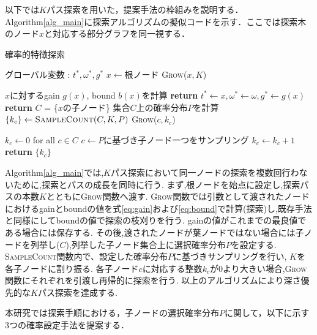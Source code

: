 以下では$K$パス探索を用いた，提案手法の枠組みを説明する．
Algorithm\ref{alg_main}に探索アルゴリズムの擬似コードを示す．ここでは探索木のノード$x$と対応する部分グラフを同一視する．
\begin{algorithm}
	\small 
	\caption{確率的特徴探索}\label{alg_main}
	\begin{algorithmic}[1]
		\State グローバル変数 : $t^*,\omega^*,g^*$
		\State $x \gets \text{根ノード}$ 
		\State \textsc{Grow}($x,K$)
		\EndProcedure

		\State $x$に対するgain $g(x)$, bound $b(x)$を計算
		\State \textbf{return}
		\EndIf
		\State $t^* \gets x,\omega^* \gets \omega,g^* \gets g(x)$
		\EndIf
		\State \textbf{return}
		\EndIf
		\State$C$ = \{$x$の子ノード\}
		\State 集合$C$上の確率分布$P$を計算 
		\State $\{k_c\} \gets \textsc{SampleCount}(C,K,P)$
		\State \textsc{Grow}($c,k_c$)
		\EndIf
		\EndFor
		\EndFunction

		\State $k_c \gets 0$ for all $c \in C$ 
		\State $c \gets \text{$P$に基づき子ノード一つをサンプリング} $
		\State $k_c \gets k_c + 1$
		\EndFor
		\State \textbf{return} $\{k_c\}$
		\EndFunction
	\end{algorithmic}
\end{algorithm}

Algorithm\ref{alg_main}では,$K$パス探索において同一ノードの探索を複数回行わないために,探索とパスの成長を同時に行う.
まず,根ノードを始点に設定し,探索パスの本数$K$とともに\textsc{Grow}関数へ渡す.
\textsc{Grow}関数では引数として渡されたノードにおけるgainとboundの値を式\eqref{eq:gain}および\eqref{eq:bound}で計算(探索)し,既存手法と同様にしてboundの値で探索の枝刈りを行う.
gainの値がこれまでの最良値である場合には保存する.
その後,渡されたノードが葉ノードではない場合には子ノードを列挙し($C$),列挙した子ノード集合上に選択確率分布$P$を設定する.
\textsc{SampleCount}関数内で、設定した確率分布$P$に基づきサンプリングを行い, $K$を各子ノードに割り振る.
各子ノード$c$に対応する整数$k_c$が$0$より大きい場合,\textsc{Grow}関数にそれぞれを引渡し再帰的に探索を行う.
以上のアルゴリズムにより深さ優先的な$K$パス探索を達成する.

本研究では探索手順における，子ノードの選択確率分布$P$に関して，以下に示す3つの確率設定手法を提案する．

